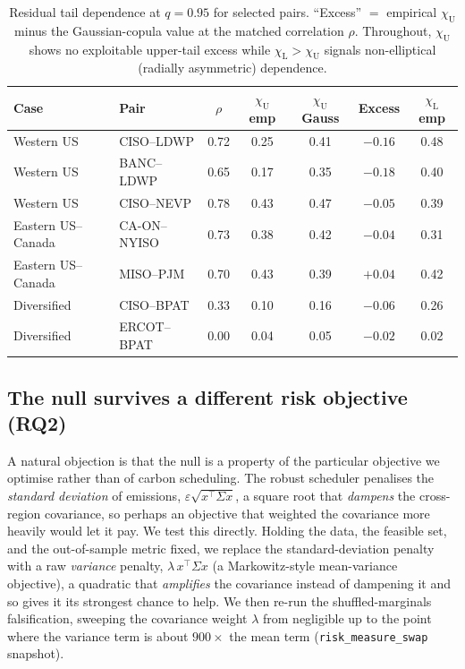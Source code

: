 \documentclass[12pt]{article}
\newcommand{\chiU}{\chi_{\mathrm{U}}}
\newcommand{\chiL}{\chi_{\mathrm{L}}}
\begin{document}
\begin{table}[t]
\centering\small
\caption{Residual tail dependence at $q=0.95$ for selected pairs. ``Excess'' $=$
empirical $\chiU$ minus the Gaussian-copula value at the matched correlation
$\rho$. Throughout, $\chiU$ shows no exploitable upper-tail excess while
$\chiL>\chiU$ signals non-elliptical (radially asymmetric) dependence.}
\label{tab:tails}
\begin{tabular}{llccccc}
\toprule
Case & Pair & $\rho$ & $\chiU$ emp & $\chiU$ Gauss & Excess & $\chiL$ emp\\
\midrule
Western US & CISO--LDWP & 0.72 & 0.25 & 0.41 & $-0.16$ & 0.48\\
Western US & BANC--LDWP & 0.65 & 0.17 & 0.35 & $-0.18$ & 0.40\\
Western US & CISO--NEVP & 0.78 & 0.43 & 0.47 & $-0.05$ & 0.39\\
Eastern US--Canada & CA-ON--NYISO & 0.73 & 0.38 & 0.42 & $-0.04$ & 0.31\\
Eastern US--Canada & MISO--PJM    & 0.70 & 0.43 & 0.39 & $+0.04$ & 0.42\\
Diversified & CISO--BPAT & 0.33 & 0.10 & 0.16 & $-0.06$ & 0.26\\
Diversified & ERCOT--BPAT & 0.00 & 0.04 & 0.05 & $-0.02$ & 0.02\\
\bottomrule
\end{tabular}
\end{table}

\subsection{The null survives a different risk objective
(RQ2)}\label{sec:res-swap}
A natural objection is that the null is a property of the particular objective we
optimise rather than of carbon scheduling. The robust scheduler penalises the
\emph{standard deviation} of emissions, $\varepsilon\sqrt{x^\top\Sigma x}$, a square root
that \emph{dampens} the cross-region covariance, so perhaps an objective that weighted the
covariance more heavily would let it pay. We test this directly. Holding the data, the
feasible set, and the out-of-sample metric fixed, we replace the standard-deviation
penalty with a raw \emph{variance} penalty, $\lambda\,x^\top\Sigma x$ (a Markowitz-style
mean-variance objective), a quadratic that \emph{amplifies} the covariance instead of
dampening it and so gives it its strongest chance to help. We then re-run the
shuffled-marginals falsification, sweeping the covariance weight $\lambda$ from negligible
up to the point where the variance term is about $900\times$ the mean term
(\texttt{risk\_measure\_swap} snapshot).
\end{document}
